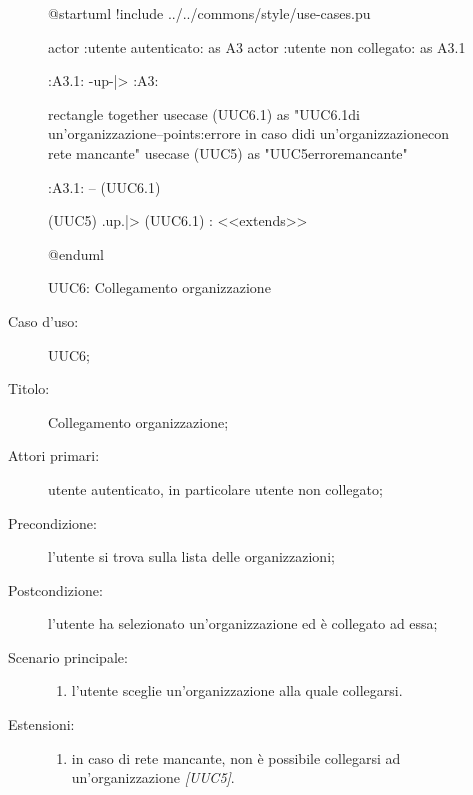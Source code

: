 \documentclass[../../../analisi-dei-requisiti.tex]{subfiles}
\begin{document}
\begin{figure}[H]
  \centering
  \begin{plantuml}
  @startuml
  !include ../../commons/style/use-cases.pu

  actor :utente autenticato: as A3
  actor :utente non collegato: as A3.1

  :A3.1: -up-|> :A3:

  rectangle {
    together {
      usecase (UUC6.1) as "UUC6.1\nSelezionamento di un'organizzazione\n--\nExtension points:\nVisualizzazione errore in caso di\nselezionamento di un'organizzazione\n con rete mancante"
      usecase (UUC5) as "UUC5\nVisualizzazione errore\nrete mancante"
    }
  }

  :A3.1: -- (UUC6.1)

  (UUC5) .up.|> (UUC6.1) : <<extends>>

  @enduml
  \end{plantuml}
  \caption{UUC6: Collegamento organizzazione}%
  \label{fig:uuc6}
\end{figure}

\begin{description}
  \item[Caso d’uso:] UUC6;
  \item[Titolo:] Collegamento organizzazione;
  \item[Attori primari:] utente autenticato, in particolare utente non collegato;
  \item[Precondizione:] l'utente si trova sulla lista delle organizzazioni;
  \item[Postcondizione:] l'utente ha selezionato un'organizzazione ed è collegato ad essa;
  \item[Scenario principale:]
        \begin{enumerate}
          \item l'utente sceglie un'organizzazione alla quale collegarsi.
        \end{enumerate}
  \item[Estensioni:]
        \begin{enumerate}
          \item in caso di rete mancante, non è possibile collegarsi ad un'organizzazione \emph{[UUC5]}.
        \end{enumerate}
\end{description}
\end{document}
